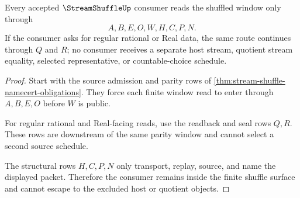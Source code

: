 \begin{theorem}
\label{thm:stream-shuffle-parity-window-nonescape}
Every accepted $\StreamShuffleUp$ consumer reads the shuffled window only
through
$$
A,B,E,O,W,H,C,P,N .
$$
If the consumer asks for regular rational or Real data, the same route
continues through $Q$ and $R$; no consumer receives a separate host stream,
quotient stream equality, selected representative, or countable-choice
schedule.
\end{theorem}
\begin{proof}
Start with the source admission and parity rows of
\autoref{thm:stream-shuffle-namecert-obligations}. They force each finite
window read to enter through $A,B,E,O$ before $W$ is public.

For regular rational and Real-facing reads, use the readback and seal rows
$Q,R$. These rows are downstream of the same parity window and cannot select a
second source schedule.

The structural rows $H,C,P,N$ only transport, replay, source, and name the
displayed packet. Therefore the consumer remains inside the finite shuffle
surface and cannot escape to the excluded host or quotient objects.
\end{proof}





